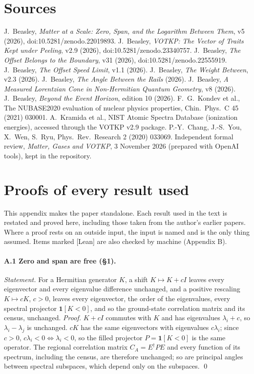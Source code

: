 \documentclass[11pt]{article}
\theoremstyle{definition}
\begin{document}
\section*{Sources}
\small
J.~Beasley, \emph{Matter at a Scale: Zero, Span, and the Logarithm Between Them}, v5 (2026), doi:10.5281/zenodo.22019893.
J.~Beasley, \emph{VOTKP: The Vector of Traits Kept under Peeling}, v2.9 (2026), doi:10.5281/zenodo.23340757.
J.~Beasley, \emph{The Offset Belongs to the Boundary}, v31 (2026), doi:10.5281/zenodo.22555919.
J.~Beasley, \emph{The Offset Speed Limit}, v1.1 (2026).
J.~Beasley, \emph{The Weight Between}, v2.3 (2026).
J.~Beasley, \emph{The Angle Between the Rails} (2026).
J.~Beasley, \emph{A Measured Lorentzian Cone in Non-Hermitian Quantum Geometry}, v8 (2026).
J.~Beasley, \emph{Beyond the Event Horizon}, edition 10 (2026).
F.~G.~Kondev et al., The NUBASE2020 evaluation of nuclear physics properties, Chin.\ Phys.\ C 45 (2021) 030001.
A.~Kramida et al., NIST Atomic Spectra Database (ionization energies), accessed through the VOTKP v2.9 package.
P.-Y.~Chang, J.-S.~You, X.~Wen, S.~Ryu, Phys.\ Rev.\ Research 2 (2020) 033069.
Independent formal review, \emph{Matter, Gases and VOTKP}, 3 November 2026 (prepared with OpenAI tools), kept in the repository.
\normalsize

\appendix
\section{Proofs of every result used}
This appendix makes the paper standalone. Each result used in the text is restated and proved here, including those taken from the author's earlier papers. Where a proof rests on an outside input, the input is named and is the only thing assumed. Items marked \textsf{[Lean]} are also checked by machine (Appendix B).

\paragraph{A.1 Zero and span are free (§1).}
\emph{Statement.} For a Hermitian generator $K$, a shift $K\mapsto K+cI$ leaves every eigenvector and every eigenvalue difference unchanged, and a positive rescaling $K\mapsto cK$, $c>0$, leaves every eigenvector, the order of the eigenvalues, every spectral projector $\mathbf 1[K<0]$, and so the ground-state correlation matrix and its census, unchanged.
\emph{Proof.} $K+cI$ commutes with $K$ and has eigenvalues $\lambda_i+c$, so $\lambda_i-\lambda_j$ is unchanged. $cK$ has the same eigenvectors with eigenvalues $c\lambda_i$; since $c>0$, $c\lambda_i<0\iff\lambda_i<0$, so the filled projector $P=\mathbf 1[K<0]$ is the same operator. The regional correlation matrix $C_A=E^\dagger PE$ and every function of its spectrum, including the census, are therefore unchanged; so are principal angles between spectral subspaces, which depend only on the subspaces. \qed
\end{document}
